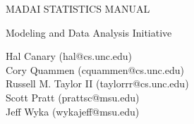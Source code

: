 \documentclass[pdftex,12pt]{article}
\begin{document}
\thispagestyle{empty}

\begin{center}
{\LARGE MADAI STATISTICS MANUAL}\\

\vspace*{6pt}

{\Large Modeling and Data Analysis Initiative}
\date{today}

\vspace*{20pt}

Hal Canary (hal@cs.unc.edu)\\
Cory Quammen (cquammen@cs.unc.edu)\\
Russell M. Taylor II (taylorrr@cs.unc.edu)\\
Scott Pratt (prattsc@msu.edu)\\
Jeff Wyka (wykajeff@msu.edu)

\end{center}

\tableofcontents



\newpage


\newpage


\newpage


\newpage


\newpage


\newpage


\newpage


\newpage


%
\end{document}
